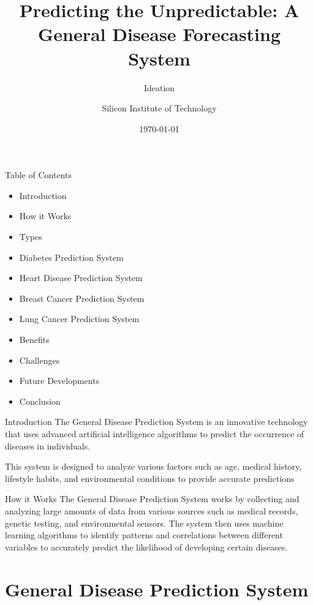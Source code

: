 \documentclass{SKP-beamer}
\title[General Disease Prediction System]{Predicting the Unpredictable: A General Disease Forecasting System}
\subtitle{Ideation}
\author{Silicon Institute of Technology}
\institute[SBP]{
  DEPARTMENT OF COMPUTER SCIENCE AND ENGINEERING
}
\date{\today}
\begin{document}
\begin{frame}
  \titlepage
\end{frame}


\begin{frame}{Table of Contents}
	\begin{itemize}
		\item Introduction
		\item How it Works
		\item Types
		\item Diabetes Prediction System
		\item Heart Disease Prediction System
		\item Breast Cancer Prediction System
		\item Lung Cancer Prediction System
		\item Benefits
		\item Challenges
		\item Future Developments
		\item Conclusion
	\end{itemize}
\end{frame}

\begin{frame}{Introduction}
  The General Disease Prediction System is an innovative technology that uses advanced artificial intelligence algorithms to predict the occurrence of diseases in individuals.
  
  This system is designed to analyze various factors such as age, medical history, lifestyle habits, and environmental conditions to provide accurate predictions
\end{frame}






\begin{frame}{How it Works}
		The General Disease Prediction System works by collecting and analyzing large amounts of data from various sources such as medical records, genetic testing, and environmental sensors.
		The system then uses machine learning algorithms to identify patterns and correlations between different variables to accurately predict the likelihood of developing certain diseases.
\end{frame}

\section{General Disease Prediction System}
\end{document}
